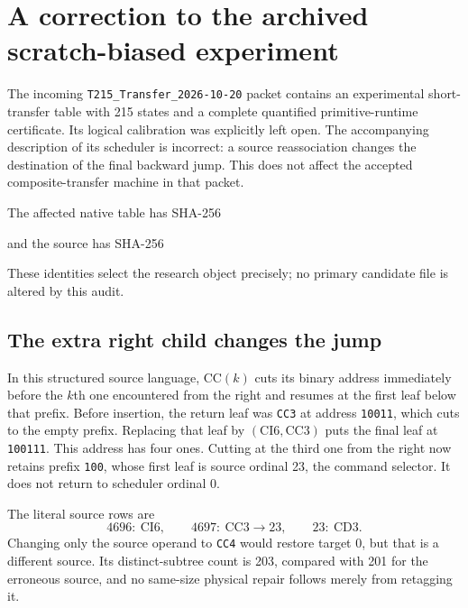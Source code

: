 \section{A correction to the archived scratch-biased experiment}
\label{sec:scratch-return-correction}

The incoming \texttt{T215\_Transfer\_2026-10-20} packet contains an
experimental short-transfer table with 215 states and a complete quantified
primitive-runtime certificate.  Its logical calibration was explicitly left
open.  The accompanying description of its scheduler is incorrect: a source
reassociation changes the destination of the final backward jump.
This does not affect the accepted composite-transfer machine in that packet.

The affected native table has SHA-256
\begin{center}\small{}\end{center}
and the source has SHA-256
\begin{center}\small{}\end{center}
These identities select the research object precisely; no primary candidate
file is altered by this audit.

\subsection{The extra right child changes the jump}
In this structured source language, $\mathrm{CC}(k)$ cuts its binary address
immediately before the $k$th one encountered from the right and resumes at
the first leaf below that prefix.  Before insertion, the return leaf was
\texttt{CC3} at address \texttt{10011}, which cuts to the empty prefix.
Replacing that leaf by $(\mathrm{CI6},\mathrm{CC3})$ puts the final leaf at
\texttt{100111}.  This address has four ones.  Cutting at the third one from
the right now retains prefix \texttt{100}, whose first leaf is source
ordinal 23, the command selector.  It does not return to scheduler ordinal 0.

The literal source rows are
\[
 4696:\ \mathrm{CI6},\qquad
 4697:\ \mathrm{CC3}\longrightarrow 23,\qquad
 23:\ \mathrm{CD3}.
\]
Changing only the source operand to \texttt{CC4} would restore target 0,
but that is a different source.  Its distinct-subtree count is 203, compared
with 201 for the erroneous source, and no same-size physical repair follows
merely from retagging it.

